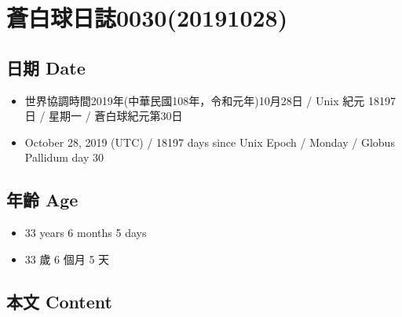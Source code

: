 \documentclass[a5paper, 12pt
]{book}
\providecommand{\tightlist}{%
  \setlength{\itemsep}{0pt}\setlength{\parskip}{0pt}}
\begin{document}
\hypertarget{ux84bcux767dux7403ux65e5ux8a8c003020191028}{%
\section{蒼白球日誌0030(20191028)}\label{ux84bcux767dux7403ux65e5ux8a8c003020191028}}

\hypertarget{ux65e5ux671f-date-27}{%
\subsection{日期 Date}\label{ux65e5ux671f-date-27}}

\begin{itemize}
\tightlist
\item
  世界協調時間2019年(中華民國108年，令和元年)10月28日 / Unix 紀元 18197
  日 / 星期一 / 蒼白球紀元第30日
\item
  October 28, 2019 (UTC) / 18197 days since Unix Epoch / Monday / Globus
  Pallidum day 30
\end{itemize}

\hypertarget{ux5e74ux9f61-age-27}{%
\subsection{年齡 Age}\label{ux5e74ux9f61-age-27}}

\begin{itemize}
\tightlist
\item
  33 years 6 months 5 days
\item
  33 歲 6 個月 5 天
\end{itemize}

\hypertarget{ux672cux6587-content-27}{%
\subsection{本文 Content}\label{ux672cux6587-content-27}}
\end{document}
